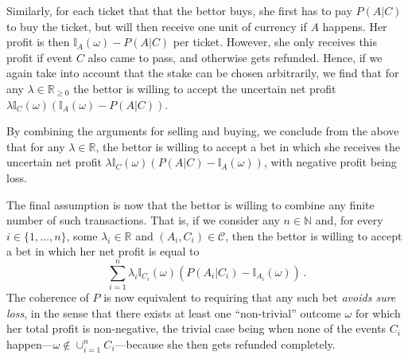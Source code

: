\documentclass[10pt,a4paper]{paper}
\theoremstyle{definition}
\newcommand{\nats}{\mathbb{N}}
\newcommand{\reals}{\mathbb{R}}
\newcommand{\realsnonneg}{\reals_{\geq 0}}
\newcommand{\ind}[1]{\mathbb{I}_{#1}}
\begin{document}
Similarly, for each ticket that that the bettor buys, she first has to pay $P(A\vert C)$ to buy the ticket, but will then receive one unit of currency if $A$ happens. Her profit is then $\ind{A}(\omega) - P(A\vert C)$ per ticket. However, she only receives this profit if event $C$ also came to pass, and otherwise gets refunded. Hence, if we again take into account that the stake can be chosen arbitrarily, we find that for any $\lambda\in\realsnonneg$ the bettor is willing to accept the uncertain net profit $\lambda\ind{C}(\omega)(\ind{A}(\omega) - P(A\vert C))$. %

By combining the arguments for selling and buying, we conclude from the above that for any $\lambda\in\reals$, the bettor is willing to accept a bet in which she receives the uncertain net profit $\lambda\ind{C}(\omega)(P(A\vert C)-\ind{A}(\omega))$, with negative profit being loss.



The final assumption is now that the bettor is willing to combine any finite number of such transactions. That is, if we consider any $n\in\nats$ and, for every $i\in\{1,\ldots,n\}$, some $\lambda_i\in\reals$ and $(A_i,C_i)\in\mathcal{C}$, then the bettor is willing to accept a bet in which her net profit is equal to
\begin{equation*}
\sum_{i=1}^n\lambda_i\ind{C_i}(\omega)\left(P(A_i\vert C_i) - \ind{A_i}(\omega)\right)\,.
\end{equation*}
The coherence of $P$ is now equivalent to requiring that any such bet \emph{avoids sure loss}, in the sense that there exists at least one ``non-trivial'' outcome $\omega$ for which her total profit is non-negative, the trivial case being when none of the events $C_i$ happen---$\omega\notin\cup_{i=1}^n C_i$---because she then gets refunded completely. %
\end{document}
